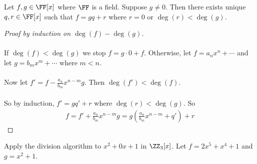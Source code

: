 \documentclass[class=scrartcl, crop=false]{standalone}
\begin{document}
\begin{theorem}
  Let $f, g \in \FF[x]$ where $\FF$ is a field. Suppose $g \neq 0$. Then there exists unique $q, r \in \FF[x]$ such that $f = g q + r$ where $r = 0$ or $\deg(r) < \deg(g)$.

  \begin{proof}[Proof by induction on $\deg(f) - \deg(g)$] \leavevmode \\\\
     If $\deg(f) < \deg(g)$ we stop $f = g \cdot 0 + f$. Otherwise, let $f = a_nx^n + \cdots$ and let $g = b_m x^m + \cdots$ where $m < n$.
    \\\\
    Now let $f' = f - \frac{a_n}{b_m}x^{n - m}g$. Then $\deg(f') < \deg(f)$.
    \\\\
    So by induction, $f' = gq' + r$ where $\deg(r) < \deg(g)$. So
    \begin{gather*}
      f = f' + \frac{a_n}{b_m}x^{n - m}g = g(\frac{a_n}{b_m}x^{n - m} + q') + r
    \end{gather*} 
  \end{proof} 
\end{theorem} 

\begin{example}
  Apply the division algorithm to $x^2 + 0x + 1$ in $\ZZ_3[x]$. Let $f = 2x^5 + x^4 + 1$ and $g = x^2 + 1$.
\end{example} 
\end{document}
